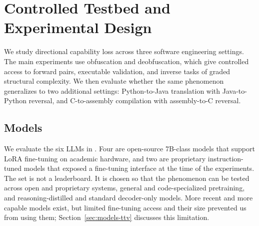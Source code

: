 \section{Controlled Testbed and Experimental Design}
\label{sec:experiment_setup}

We study directional capability loss across three software engineering settings. 
The main
experiments use obfuscation and deobfuscation, which give controlled access to
forward pairs, executable validation, and inverse tasks of graded structural
complexity. 
We then evaluate whether the same phenomenon generalizes to two additional settings: Python-to-Java translation with Java-to-Python reversal, and C-to-assembly compilation with assembly-to-C reversal.

\subsection{Models}
\label{sec:models}

We evaluate the six LLMs in . Four are open-source 7B-class
models that support LoRA fine-tuning on academic hardware, and two are
proprietary instruction-tuned models that exposed a fine-tuning interface at the
time of the experiments. The set is not a leaderboard. It is chosen so that the
phenomenon can be tested across open and proprietary systems, general and
code-specialized pretraining, and reasoning-distilled and standard decoder-only
models. More recent and more capable models exist, but limited fine-tuning access and their size prevented us from using them; Section~\ref{sec:models-ttv} discusses this limitation.


